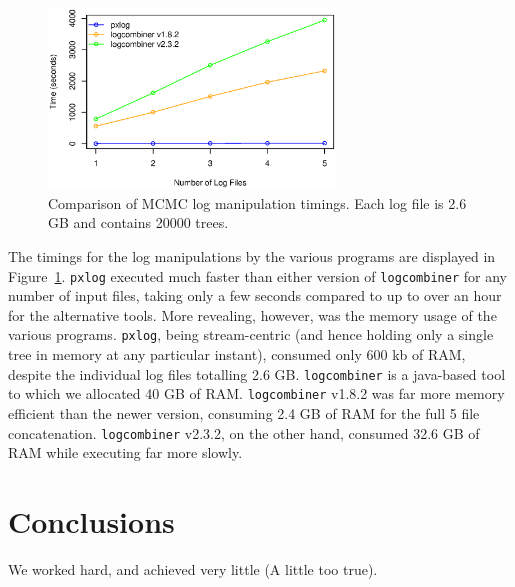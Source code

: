\documentclass{article}
\begin{document}
\begin{figure}[!h]
    \centering
    \includegraphics[width=3.0in]{log}
    \caption{Comparison of MCMC log manipulation timings. Each log file
    is 2.6 GB and contains 20000 trees.}
    \label{logfigure}
\label{fig:S3}
\end{figure}

The timings for the log manipulations by the various programs are
displayed in Figure~\ref{fig:S3}. \texttt{pxlog} executed much faster
than either version of \texttt{logcombiner} for any number of input
files, taking only a few seconds compared to up to over an hour for the
alternative tools. More revealing, however, was the memory usage of the
various programs. \texttt{pxlog}, being stream-centric (and hence holding
only a single tree in memory at any particular instant), consumed only 
600 kb of RAM, despite the individual log files totalling 2.6 GB.
\texttt{logcombiner} is a java-based tool to which we allocated 40 GB of
RAM. \texttt{logcombiner} v1.8.2 was far more memory efficient than the
newer version, consuming 2.4 GB of RAM for the full 5 file concatenation.
\texttt{logcombiner} v2.3.2, on the other hand, consumed 32.6 GB of
RAM while executing far more slowly.

\section{Conclusions}\label{conclusions}
We worked hard, and achieved very little (A little too true).


%
%
%
%
%
%

\end{document}
